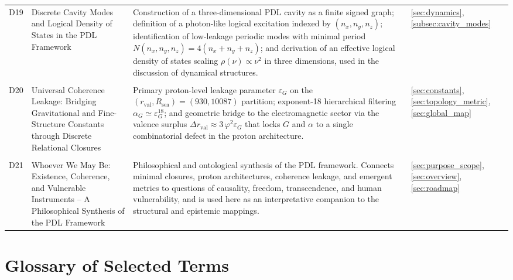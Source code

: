 \documentclass[11pt,a4paper]{article}
\begin{document}
\begin{longtable}{@{}p{0.9cm}L{5cm}L{6.5cm}L{2.4cm}@{}}
  D19 & 
  Discrete Cavity Modes and Logical Density of States in the PDL Framework & Construction of a three-dimensional PDL cavity as a finite signed graph; definition of a photon-like logical excitation indexed by $(n_x,n_y,n_z)$; identification of low-leakage periodic modes with minimal period $N(n_x,n_y,n_z)=4(n_x+n_y+n_z)$; and derivation of an effective logical density of states scaling $\rho(\nu)\propto \nu^2$ in three dimensions, used in the discussion of dynamical structures. & 
  \ref{sec:dynamics}, \ref{subsec:cavity_modes} \\\\[0.4em]

  D20 &
  Universal Coherence Leakage: Bridging Gravitational and Fine-Structure Constants through Discrete Relational Closures &
  Primary proton-level leakage parameter $\varepsilon_G$ on the $(r_{\mathrm{val}},R_{\mathrm{sea}})=(930,10087)$ partition; exponent-18 hierarchical filtering $\alpha_G \simeq \varepsilon_G^{18}$; and geometric bridge to the electromagnetic sector via the valence surplus $\Delta r_{\mathrm{val}} \approx 3\,\varphi^2 \varepsilon_G$ that locks $G$ and $\alpha$ to a single combinatorial defect in the proton architecture. &
  \ref{sec:constants}, \ref{sec:topology_metric}, \ref{sec:global_map} \\\\[0.4em]

  D21 & 
  Whoever We May Be: Existence, Coherence, and Vulnerable Instruments -- A Philosophical Synthesis of the PDL Framework & 
  Philosophical and ontological synthesis of the PDL framework.\citep{WhoeverWeMayBe2026} Connects minimal closures, proton architectures, coherence leakage, and emergent metrics to questions of causality, freedom, transcendence, and human vulnerability, and is used here as an interpretative companion to the structural and epistemic mappings. & 
  \ref{sec:purpose_scope}, \ref{sec:overview}, \ref{sec:roadmap} \\[0.4em]


\end{longtable}

\section{Glossary of Selected Terms}
\label{app:glossary}
\end{document}
